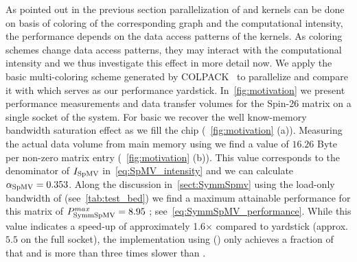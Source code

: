 
As pointed out in the previous section parallelization of \SymmSpmv and \SYMMKACZ kernels can be done on basis of \DTWO coloring of the corresponding graph and the computational intensity, \ie the performance depends on the data access patterns of the kernels. As coloring schemes change data access patterns, they may interact with the computational intensity and we thus investigate this effect in more detail now. We apply  the basic multi-coloring scheme generated by COLPACK~\cite{COLPACK} to parallelize \SymmSpmv and compare it with \SpMV which serves as our performance yardstick. In~\cref{fig:motivation} we present performance measurements and data transfer volumes for the Spin-26 matrix on a single socket of the \IVB system. For basic \SpMV we recover the well know-memory bandwidth saturation effect as we fill the chip (~\cref{fig:motivation} (a)). Measuring the actual data volume from main memory using \LIKWID we find a value of $16.26$ Byte per non-zero matrix entry (~\cref{fig:motivation} (b)). This value corresponds to the denominator of $I_\mathrm{SpMV}$ in~\cref{eq:SpMV_intensity} and we can calculate $\alpha_\mathrm{SpMV}=0.353$. Along the discussion in~\cref{sect:SymmSpmv} using the load-only bandwidth of \IVB (see~\cref{tab:test_bed}) we find a maximum attainable {\SymmSpmv} performance for this matrix of $P^{max}_\mathrm{SymmSpMV}=8.95$ \GF; see~\cref{eq:SymmSpMV_performance}. While this value indicates a speed-up of approximately 1.6$\times$ compared to \SpMV yardstick (approx. $5.5$ \GF on the full socket), the \SymmSpmv implementation using \MCfull (\MC) only achieves a fraction of that and is more than three times slower than \SpMV. 




